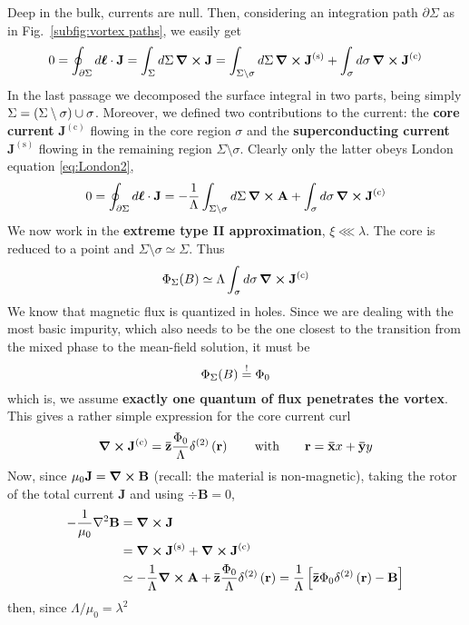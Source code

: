 Deep in the bulk, currents are null. Then, considering an integration path $\partial\Sigma$ as in Fig.~\ref{subfig:vortex paths}, we easily get
\[
    0 = \oint_{\partial\Sigma} d \bm\ell \cdot \mathbf{J} = \int_\Sigma d \Sigma \, \curl\mathbf{J} = \int_{\Sigma\setminus\sigma} d \Sigma \, \curl\mathbf{J}^{(\mathrm{s})} + \int_\sigma d \sigma \, \curl\mathbf{J}^{(\mathrm{c})}
\]
In the last passage we decomposed the surface integral in two parts, being simply $\Sigma = \left({\Sigma\setminus\sigma}\right)\cup\sigma$. Moreover, we defined two contributions to the current: the \textbf{core current} $\mathbf{J}^{(\mathrm{c})}$ flowing in the core region $\sigma$ and the \textbf{superconducting current} $\mathbf{J}^{(\mathrm{s})}$ flowing in the remaining region $\Sigma\setminus\sigma$. Clearly only the latter obeys London equation \eqref{eq:London2},
\[
    0 = \oint_{\partial\Sigma} d \bm\ell \cdot \mathbf{J} = - \frac{1}{\Lambda} \int_{\Sigma\setminus\sigma} d \Sigma \, \curl\mathbf{A} + \int_\sigma d \sigma \, \curl\mathbf{J}^{(\mathrm{c})}
\]
We now work in the \textbf{extreme type II approximation}, $\xi \lll \lambda$. The core is reduced to a point and $\Sigma\setminus\sigma\simeq\Sigma$. Thus
\[
    \Phi_\Sigma(B) \simeq \Lambda \int_\sigma d \sigma \, \curl\mathbf{J}^{(\mathrm{c})}
\]
We know that magnetic flux is quantized in holes. Since we are dealing with the most basic impurity, which also needs to be the one closest to the transition from the mixed phase to the mean-field solution, it must be
\[
    \Phi_\Sigma(B)\stackrel{!}{=}\Phi_0
\]
which is, we assume \textbf{exactly one quantum of flux penetrates the vortex}. This gives a rather simple expression for the core current curl
\[
    \curl\mathbf{J}^{(\mathrm{c})} = \versor{z} \frac{\Phi_0}{\Lambda} \delta^{(2)}\lrR{\mathbf{r}}
    \quad\qq{with}\quad
    \mathbf{r} = \versor{x} x + \versor{y} y
\]
Now, since $\mu_0 \mathbf{J} = \curl\mathbf{B}$ (recall: the material is non-magnetic), taking the rotor of the total current $\mathbf{J}$ and using $\div\mathbf{B}=0$,
\[
\begin{aligned}
    -\frac{1}{\mu_0} \laplacian\mathbf{B} &= \curl\mathbf{J} \\
    &= \curl\mathbf{J}^{(\mathrm{s})} + \curl\mathbf{J}^{(\mathrm{c})} \\
    &\simeq - \frac{1}{\Lambda} \curl\mathbf{A} + \versor{z} \frac{\Phi_0}{\Lambda} \delta^{(2)}\lrR{\mathbf{r}} = \frac{1}{\Lambda} \lrS{ \versor{z}\Phi_0 \delta^{(2)}\lrR{\mathbf{r}} - \mathbf{B} }
\end{aligned}
\]
then, since $\Lambda/\mu_0=\lambda^2$
